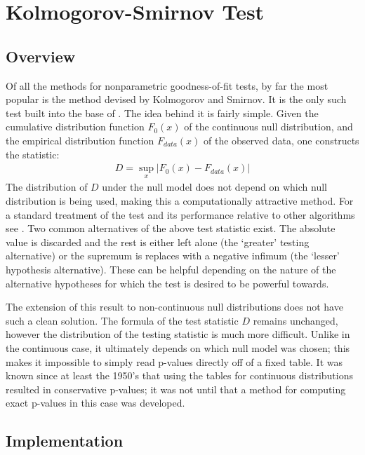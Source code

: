 \documentclass[article]{jss}
\begin{document}
\section{Kolmogorov-Smirnov Test}


\subsection{Overview}

Of all the methods for nonparametric goodness-of-fit tests, by far the most popular is the method devised by Kolmogorov and Smirnov.
It is the only such test built into the base of . The idea behind it is fairly simple. Given the cumulative distribution
function $F_0(x)$ of the continuous null distribution, and the empirical distribution function $F_{data}(x)$ of the observed data, 
one constructs the statistic:
\begin{align}
D = \sup_x \left| F_0(x)- F_{data}(x) \right|
\end{align}
The distribution of $D$ under the null model does not depend on which null distribution is being used, making this a computationally
attractive method. For a standard treatment of the test and its performance relative to other algorithms see \cite{slakter65}. Two common
alternatives of the above test statistic exist. The absolute value is discarded and the rest is either left alone (the `greater' testing 
alternative) or the supremum is replaces with a negative infimum (the `lesser' hypothesis alternative). These can be helpful depending 
on the nature of the alternative hypotheses for which the test is desired to be powerful towards.

The extension of this result to non-continuous null distributions does not have such a clean solution. The formula of
the test statistic $D$ remains unchanged, however the distribution of the testing statistic is much more difficult. Unlike in the 
continuous case, it ultimately depends on which null model was chosen; this makes it impossible to simply read p-values directly 
off of a fixed table. It was known since at least the 1950's that using the tables for continuous distributions resulted in 
conservative p-values; it was not until \citet{Conover1972} that a method for computing exact p-values in this case was developed.

\subsection{Implementation}
\end{document}
